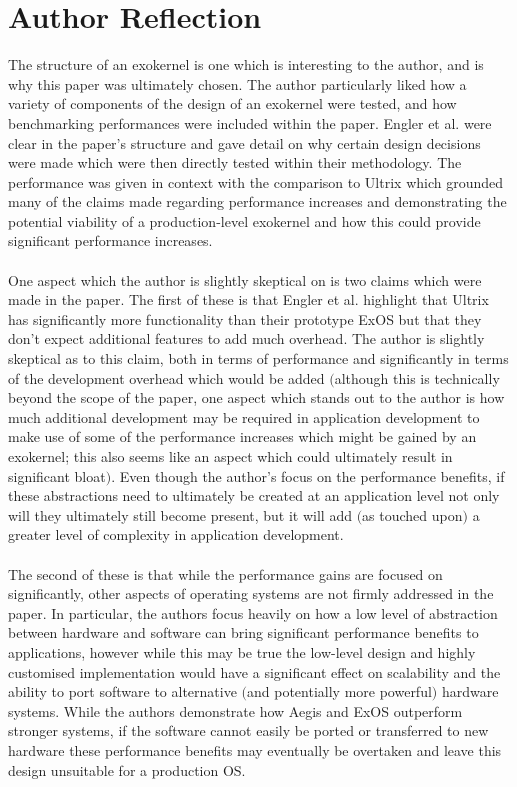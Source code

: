 \documentclass[11pt]{article}
\theoremstyle{plain}
\theoremstyle{definition}
\begin{document}
\section{Author Reflection}\label{section:Reflection}
The structure of an exokernel is one which is interesting to the author, and is why this paper was ultimately chosen. The author particularly liked how a variety of components of the design of an exokernel were tested, and how benchmarking performances were included within the paper. Engler et al. were clear in the paper's structure and gave detail on why certain design decisions were made which were then directly tested within their methodology. The performance was given in context with the comparison to Ultrix which grounded many of the claims made regarding performance increases and demonstrating the potential viability of a production-level exokernel and how this could provide significant performance increases.\\
\\
One aspect which the author is slightly skeptical on is two claims which were made in the paper. The first of these is that Engler et al. highlight that Ultrix has significantly more functionality than their prototype ExOS but that they don't expect additional features to add much overhead. The author is slightly skeptical as to this claim, both in terms of performance and significantly in terms of the development overhead which would be added $($although this is technically beyond the scope of the paper, one aspect which stands out to the author is how much additional development may be required in application development to make use of some of the performance increases which might be gained by an exokernel; this also seems like an aspect which could ultimately result in significant bloat$)$. Even though the author's focus on the performance benefits, if these abstractions need to ultimately be created at an application level not only will they ultimately still become present, but it will add $($as touched upon$)$ a greater level of complexity in application development.\\
\\
The second of these is that while the performance gains are focused on significantly, other aspects of operating systems are not firmly addressed in the paper. In particular, the authors focus heavily on how a low level of abstraction between hardware and software can bring significant performance benefits to applications, however while this may be true the low-level design and highly customised implementation would have a significant effect on scalability and the ability to port software to alternative $($and potentially more powerful$)$ hardware systems. While the authors demonstrate how Aegis and ExOS outperform stronger systems, if the software cannot easily be ported or transferred to new hardware these performance benefits may eventually be overtaken and leave this design unsuitable for a production OS.\\
\end{document}
